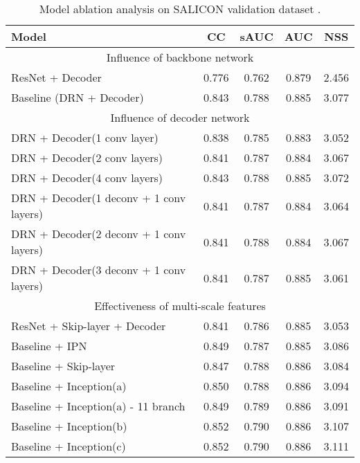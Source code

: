 \begin{table}[]
	\centering
	\scriptsize
	\caption{
		Model ablation analysis on SALICON validation dataset \cite{jiang2015salicon}.
		}
	\label{table:maa}
	\begin{tabular}{|l|cccc|}
		\hline
		Model                                & CC     & sAUC  & AUC   & NSS   \\ \hline\hline
		\multicolumn{5}{|c|}{Influence of backbone network}               \\ \hline
		ResNet + Decoder               & 0.776  & 0.762  & 0.879 & 2.456 \\ \hline
		Baseline (DRN + Decoder)       & 0.843  & 0.788 & 0.885 & 3.077 \\ \hline\hline
		\multicolumn{5}{|c|}{Influence of decoder network}               \\ \hline
		DRN + Decoder(1 conv layer)               & 0.838  & 0.785  & 0.883 & 3.052 \\ \hline
		DRN + Decoder(2 conv layers)               & 0.841  & 0.787 & 0.884 & 3.067\\ \hline
		DRN + Decoder(4 conv layers)               & 0.843  & 0.788  & 0.885 & 3.072 \\ \hline
		DRN + Decoder(1 deconv + 1 conv layers)       &0.841   & 0.787 & 0.884  & 3.064 \\ \hline			
		DRN + Decoder(2 deconv + 1 conv layers)       & 0.841  & 0.788 & 0.884 & 3.067 \\ \hline
		DRN + Decoder(3 deconv + 1 conv layers)       & 0.841  & 0.787  & 0.885 & 3.061 \\ \hline\hline						
		\multicolumn{5}{|c|}{Effectiveness of multi-scale features} \\ \hline
		ResNet + Skip-layer + Decoder & 0.841  & 0.786  & 0.885 & 3.053 \\ \hline 
		Baseline + IPN                       & 0.849   & 0.787 & 0.885 & 3.086 \\ \hline
		Baseline + Skip-layer                      & 0.847  & 0.788  & 0.886 & 3.084 \\ \hline
		Baseline + Inception(a)            & 0.850   & 0.788 & 0.886 & 3.094 \\ \hline
		Baseline + Inception(a) - 11 branch      &0.849	&0.789	&0.886	&3.091 \\ \hline
		Baseline + Inception(b)             &0.852	&0.790	&0.886	&3.107 \\ \hline		
		Baseline + Inception(c)             & 0.852	&0.790	&0.886	&3.111 \\ \hline		

\end{tabular}
\end{table}
